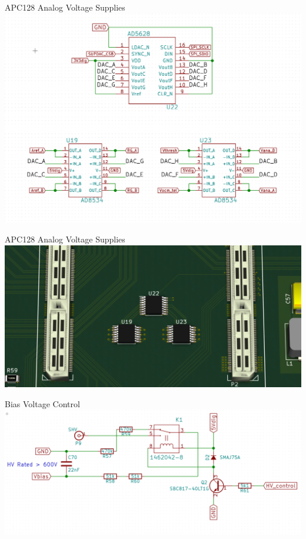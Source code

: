\documentclass{beamer}
\begin{document}
\begin{frame}{APC128 Analog Voltage Supplies}
  \centering
  \includegraphics[width=\textwidth]{figures/Analog_Supply_Schem}
\end{frame}

\begin{frame}{APC128 Analog Voltage Supplies}
  \centering
  \includegraphics[width=\textwidth]{figures/DAQCard2015_Analog_Supply}
\end{frame}

\begin{frame}{Bias Voltage Control}
  \centering
  \includegraphics[width=\textwidth]{figures/HV_Schem}
\end{frame}
\end{document}
